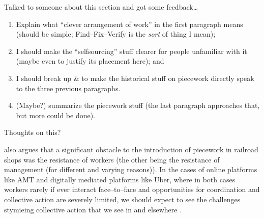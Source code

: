 \documentclass[trackingWork]{subfiles}
\begin{document}
{      Talked to someone about this section and got some feedback\dots
      \begin{enumerate}
        \item Explain what ``clever arrangement of work'' in the first paragraph means
              (should be simple; Find--Fix--Verify is the \textit{sort} of thing I mean);
        \item I should make the ``selfsourcing'' stuff clearer for people unfamiliar with it
              (maybe even to justify its placement here); and
        \item I should break up \citeauthor{10.2307/23702539} \& \citeauthor{Brown01041990}
              to make the historical stuff on piecework
              directly speak to the three previous paragraphs.
        \item (Maybe?) summarize the piecework stuff
              (the last paragraph approaches that, but more could be done).
      \end{enumerate}
      Thoughts on this?

  \citeauthor{10.2307/23702539} also argues that
  a significant obstacle to the introduction of piecework in railroad shops was
  the resistance of workers
  (the other being the resistance of management (for different and varying reasons)).
  In the cases of online platforms like AMT and digitally mediated platforms like Uber,
  where in both cases workers rarely
  if ever
  interact face--to--face and
  opportunities for coordination and collective action are severely limited,
  we should expect to see
  the challenges stymieing collective action
  that we see in \citeauthor{dynamo} and elsewhere
  \cite{10.2307/23702539,dynamo}.
}
\end{document}

